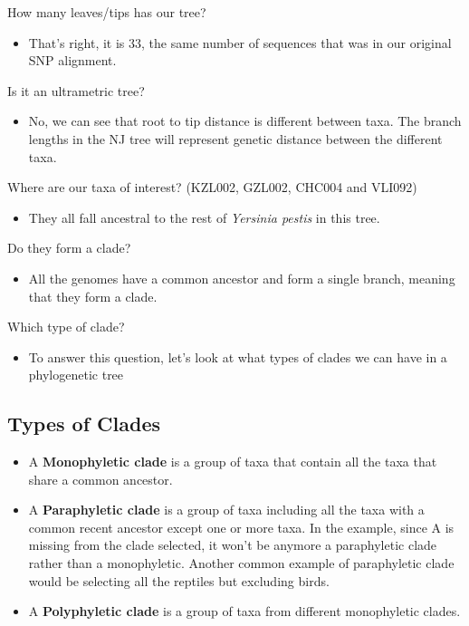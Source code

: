 \documentclass[
  letterpaper,
]{book}
\providecommand{\tightlist}{%
  \setlength{\itemsep}{0pt}\setlength{\parskip}{0pt}}\usepackage{longtable,booktabs,array}
\begin{document}
How many leaves/tips has our tree?

\begin{itemize}
\tightlist
\item
  That's right, it is 33, the same number of sequences that was in our
  original SNP alignment.
\end{itemize}

Is it an ultrametric tree?

\begin{itemize}
\tightlist
\item
  No, we can see that root to tip distance is different between taxa.
  The branch lengths in the NJ tree will represent genetic distance
  between the different taxa.
\end{itemize}

Where are our taxa of interest? (KZL002, GZL002, CHC004 and VLI092)

\begin{itemize}
\tightlist
\item
  They all fall ancestral to the rest of \emph{Yersinia pestis} in this
  tree.
\end{itemize}

Do they form a clade?

\begin{itemize}
\tightlist
\item
  All the genomes have a common ancestor and form a single branch,
  meaning that they form a clade.
\end{itemize}

Which type of clade?

\begin{itemize}
\tightlist
\item
  To answer this question, let's look at what types of clades we can
  have in a phylogenetic tree
\end{itemize}

\hypertarget{types-of-clades}{%
\subsection{Types of Clades}\label{types-of-clades}}

\begin{itemize}
\tightlist
\item
  A \textbf{Monophyletic clade} is a group of taxa that contain all the
  taxa that share a common ancestor.
\item
  A \textbf{Paraphyletic clade} is a group of taxa including all the
  taxa with a common recent ancestor except one or more taxa. In the
  example, since A is missing from the clade selected, it won't be
  anymore a paraphyletic clade rather than a monophyletic. Another
  common example of paraphyletic clade would be selecting all the
  reptiles but excluding birds.
\item
  A \textbf{Polyphyletic clade} is a group of taxa from different
  monophyletic clades.
\end{itemize}
\end{document}

